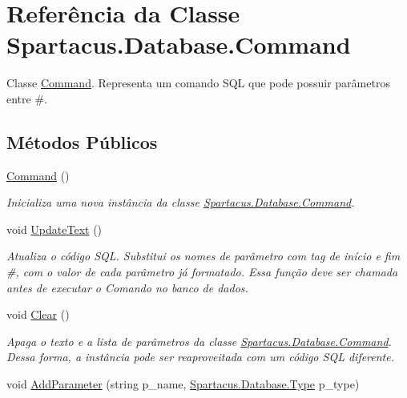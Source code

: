 \hypertarget{classSpartacus_1_1Database_1_1Command}{\section{Referência da Classe Spartacus.\+Database.\+Command}
\label{classSpartacus_1_1Database_1_1Command}
}


Classe \hyperlink{classSpartacus_1_1Database_1_1Command}{Command}. Representa um comando S\+Q\+L que pode possuir parâmetros entre \#.  


\subsection*{Métodos Públicos}
\begin{DoxyCompactItemize}
\item 
\hyperlink{classSpartacus_1_1Database_1_1Command_a0e38f3ba81cd4cb287d864cb5a74064f}{Command} ()
\begin{DoxyCompactList}\small\item\em Inicializa uma nova instância da classe \hyperlink{classSpartacus_1_1Database_1_1Command}{Spartacus.\+Database.\+Command}. \end{DoxyCompactList}\item 
void \hyperlink{classSpartacus_1_1Database_1_1Command_a3a47720daded2ce8a3040850bf8a4549}{Update\+Text} ()
\begin{DoxyCompactList}\small\item\em Atualiza o código S\+Q\+L. Substitui os nomes de parâmetro com tag de início e fim \#, com o valor de cada parâmetro já formatado. Essa função deve ser chamada antes de executar o Comando no banco de dados. \end{DoxyCompactList}\item 
void \hyperlink{classSpartacus_1_1Database_1_1Command_a84f9a1c5469c160104be652fb73be8b5}{Clear} ()
\begin{DoxyCompactList}\small\item\em Apaga o texto e a lista de parâmetros da classe \hyperlink{classSpartacus_1_1Database_1_1Command}{Spartacus.\+Database.\+Command}. Dessa forma, a instância pode ser reaproveitada com um código S\+Q\+L diferente. \end{DoxyCompactList}\item 
void \hyperlink{classSpartacus_1_1Database_1_1Command_afc24cfe49d456b8df8b7f0e2b0bb2865}{Add\+Parameter} (string p\+\_\+name, \hyperlink{namespaceSpartacus_1_1Database_a9d4c2be7c9bc257b8d34c84b43e5ec32}{Spartacus.\+Database.\+Type} p\+\_\+type)

\end{DoxyCompactItemize}
